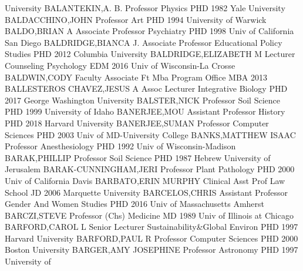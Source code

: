 \documentclass[
]{article}
\begin{document}
University \textbar BALANTEKIN,A. B. \textbar{} 
\textbar Professor \textbar Physics \textbar PHD 1982 Yale University
\textbar BALDACCHINO,JOHN \textbar{}  \textbar Professor
\textbar Art \textbar PHD 1994 University of Warwick
\textbar BALDO,BRIAN A \textbar{}  \textbar Associate
Professor \textbar Psychiatry \textbar PHD 1998 Univ of California San
Diego \textbar BALDRIDGE,BIANCA J. \textbar{} 
\textbar Associate Professor \textbar Educational Policy Studies
\textbar PHD 2012 Columbia University \textbar BALDRIDGE,ELIZABETH M
\textbar{}  \textbar Lecturer \textbar Counseling Psychology
\textbar EDM 2016 Univ of Wisconsin-La Crosse \textbar BALDWIN,CODY
\textbar{}  \textbar Faculty Associate \textbar Ft Mba
Program Office \textbar MBA 2013 \textbar BALLESTEROS CHAVEZ,JESUS A
\textbar{}  \textbar Assoc Lecturer \textbar Integrative
Biology \textbar PHD 2017 George Washington University
\textbar BALSTER,NICK \textbar{}  \textbar Professor
\textbar Soil Science \textbar PHD 1999 University of Idaho
\textbar BANERJEE,MOU \textbar{}  \textbar Assistant
Professor \textbar History \textbar PHD 2018 Harvard University
\textbar BANERJEE,SUMAN \textbar{}  \textbar Professor
\textbar Computer Sciences \textbar PHD 2003 Univ of MD-University
College \textbar BANKS,MATTHEW ISAAC \textbar{} 
\textbar Professor \textbar Anesthesiology \textbar PHD 1992 Univ of
Wisconsin-Madison \textbar BARAK,PHILLIP \textbar{} 
\textbar Professor \textbar Soil Science \textbar PHD 1987 Hebrew
University of Jerusalem \textbar BARAK-CUNNINGHAM,JERI \textbar{}
 \textbar Professor \textbar Plant Pathology \textbar PHD
2000 Univ of California Davis \textbar BARBATO,ERIN MURPHY \textbar{}
 \textbar Clinical Asst Prof \textbar Law School \textbar JD
2006 Marquette University \textbar BARCELOS,CHRIS \textbar{} 
\textbar Assistant Professor \textbar Gender And Women Studies
\textbar PHD 2016 Univ of Massachusetts Amherst \textbar BARCZI,STEVE
\textbar{}  \textbar Professor (Chs) \textbar Medicine
\textbar MD 1989 Univ of Illinois at Chicago \textbar BARFORD,CAROL L
\textbar{}  \textbar Senior Lecturer
\textbar Sustainability\&Global Environ \textbar PHD 1997 Harvard
University \textbar BARFORD,PAUL R \textbar{} 
\textbar Professor \textbar Computer Sciences \textbar PHD 2000 Boston
University \textbar BARGER,AMY JOSEPHINE \textbar{} 
\textbar Professor \textbar Astronomy \textbar PHD 1997 University of
\end{document}
